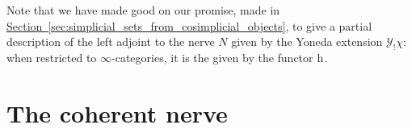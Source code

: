 \documentclass[main.tex]{subfiles}
\begin{document}
Note that we have made good on our promise, made in \hyperref[sec:simplicial_sets_from_cosimplicial_objects]{Section~\ref*{sec:simplicial_sets_from_cosimplicial_objects}}, to give a partial description of the left adjoint to the nerve $N$ given by the Yoneda extension $\mathcal{Y}_{!}\chi$: when restricted to $\infty$-categories, it is the given by the functor $\mathrm{h}$.

\section{The coherent nerve}
\label{sec:the_coherent_nerve}

%
%
%
%
\end{document}
